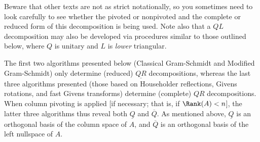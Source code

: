 \noindent Beware that other texts are not as strict notationally, so you sometimes need to look carefully to see whether
the pivoted or nonpivoted and the complete or reduced form of this decomposition is being used. 
Note also that a $QL$  decomposition may also be developed via
procedures similar to those outlined below, where $Q$ is unitary
and $L$ is {\it lower} triangular.

The first two algorithms presented below (Classical Gram-Schmidt and
Modified Gram-Schmidt) only determine (reduced)
$\underline{QR}$ decompositions, whereas the last three algorithms
presented (those based on Householder reflections, Givens
rotations, and fast Givens transforms) determine (complete) $QR$ decompositions.
When column pivoting is applied [if necessary; that is, if $\Rank(A)<n$], the latter three algorithms thus reveal
both $\underline{Q}$ and $\overline{Q}$.  As mentioned above,
$\underline{Q}$ is an orthogonal basis of the column space of $A$, and
$\overline Q$ is an orthogonal basis of the left nullspace of $A$. 


